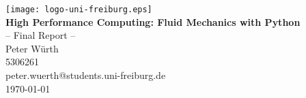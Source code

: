 \documentclass[a4paper,12pt]{article}
\makeatletter
\newcommand{\thetitle}{High Performance Computing: Fluid Mechanics with Python}
\newcommand{\thesubtitle}{-- Final Report --}
\newcommand{\theauthor}{Peter Würth}
\newcommand{\thematnr}{5306261}
\newcommand{\theemail}{peter.wuerth@students.uni-freiburg.de}
\newcommand{\thedate}{\today}
\makeatother
\begin{document}
    \begin{titlepage}
        \begin{center}
            \begin{singlespace}
                \texttt{[image: logo-uni-freiburg.eps]}\\[4\baselineskip]
                {\huge\textbf{\thetitle}}\\[1\baselineskip]
                {\Large\thesubtitle}\\[3\baselineskip]
                {\large \theauthor \\ \thematnr \\ \theemail}\\\vfill
                \thedate
            \end{singlespace}
        \end{center}
    \end{titlepage}

    \thispagestyle{empty}
    \tableofcontents
    \clearpage

    
    
    
    
    

    \printbibliography[title=References]
\end{document}
